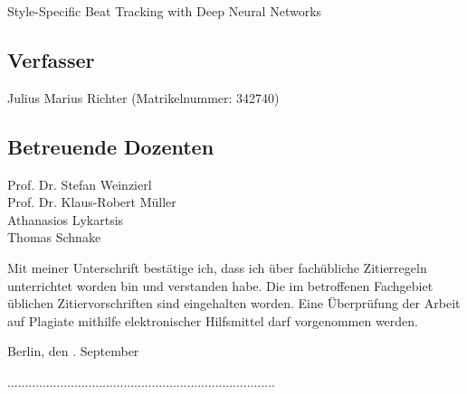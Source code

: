 \documentclass{scrartcl}
\begin{document}
Style-Specific Beat Tracking with Deep Neural Networks

\vspace{1em}
\subsection*{Verfasser}

Julius Marius Richter (Matrikelnummer: 342740)

\vspace{1em}
\subsection*{Betreuende Dozenten}

Prof. Dr. Stefan Weinzierl \\
Prof. Dr. Klaus-Robert Müller \\
Athanasios Lykartsis \\
Thomas Schnake 

\vspace{3em}

\noindent Mit meiner Unterschrift bestätige ich, dass ich über fachübliche Zi\-tier\-regeln unterrich\-tet worden bin und verstanden habe. Die im betroffenen Fachgebiet üblichen Zi\-tier\-vorschriften sind eingehalten worden. Eine Überprüfung der Arbeit auf Plagiate mithilfe elektronischer Hilfsmittel darf vorgenommen werden. 

\vspace{4em}
\noindent Berlin, den \the\day. September \the\year

\vspace{3em}
\noindent............................................................................

\newpage 
\end{document}
